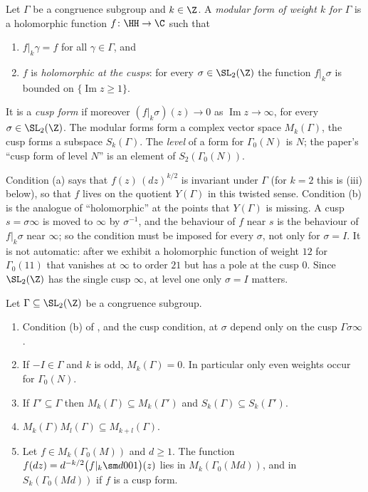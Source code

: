 \begin{definition}\label{def:modforms:modular-form}
Let $\Gamma$ be a congruence subgroup and $k\in\Z$. A \emph{modular form of weight $k$ for $\Gamma$} is a holomorphic function $f\colon\HH\to\C$ such that
\begin{enumerate}[label=(\alph*)]
\item $f|_k\gamma=f$ for all $\gamma\in\Gamma$, and
\item $f$ is \emph{holomorphic at the cusps}: for every $\sigma\in\SL_2(\Z)$ the function $f|_k\sigma$ is bounded on $\{\operatorname{Im}z\ge1\}$.
\end{enumerate}
It is a \emph{cusp form} if moreover $(f|_k\sigma)(z)\to0$ as $\operatorname{Im}z\to\infty$, for every $\sigma\in\SL_2(\Z)$. The modular forms form a complex vector space $M_k(\Gamma)$,
the cusp forms a subspace $S_k(\Gamma)$. The \emph{level} of a form for $\Gamma_0(N)$ is $N$; the paper's ``cusp form of level $N$'' is an element of $S_2(\Gamma_0(N))$.
\end{definition}

Condition (a) says that $f(z)\,(dz)^{k/2}$ is invariant under $\Gamma$ (for $k=2$ this is (iii) below), so that $f$ lives on the quotient $Y(\Gamma)$ in this twisted
sense. Condition (b) is the analogue of ``holomorphic'' at the points that $Y(\Gamma)$ is missing. A cusp $s=\sigma\infty$ is moved to $\infty$ by $\sigma^{-1}$, and the behaviour of $f$
near $s$ is the behaviour of $f|_k\sigma$ near $\infty$; so the condition must be imposed for every $\sigma$, not only for $\sigma=I$. It is not automatic: after
 we exhibit a holomorphic function of weight $12$ for $\Gamma_0(11)$ that vanishes at $\infty$ to order $21$ but has a pole at the cusp $0$. Since
$\SL_2(\Z)$ has the single cusp $\infty$, at level one only $\sigma=I$ matters.

\begin{proposition}\label{prop:modforms:mf-basic}
Let $\Gamma\subseteq\SL_2(\Z)$ be a congruence subgroup.
\begin{enumerate}[label=(\alph*)]
\item Condition (b) of , and the cusp condition, at $\sigma$ depend only on the cusp $\Gamma\sigma\infty$.
\item If $-I\in\Gamma$ and $k$ is odd, $M_k(\Gamma)=0$. In particular only even weights occur for $\Gamma_0(N)$.
\item If $\Gamma'\subseteq\Gamma$ then $M_k(\Gamma)\subseteq M_k(\Gamma')$ and $S_k(\Gamma)\subseteq S_k(\Gamma')$.
\item $M_k(\Gamma)M_l(\Gamma)\subseteq M_{k+l}(\Gamma)$.
\item Let $f\in M_k(\Gamma_0(M))$ and $d\ge1$. The function $f(dz)=d^{-k/2}\bigl(f|_k\sm d001\bigr)(z)$ lies in $M_k(\Gamma_0(Md))$, and in $S_k(\Gamma_0(Md))$ if $f$ is a cusp form.
\end{enumerate}
\end{proposition}

